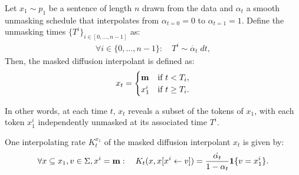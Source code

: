\begin{appdefinition}
Let $x_1 \sim p_1$ be a sentence of length $n$ drawn from the data and $\alpha_t$ a smooth unmasking schedule that interpolates from $\alpha_{t=0}=0$ to $\alpha_{t=1}=1$. Define the unmasking times $\{T^i\}_{i\in[0, \dots, n-1]}$ as:
\begin{align}
    \forall i \in \{0, \dots, n-1\}: \quad T^i \sim \dot{\alpha_t} \; dt,
\end{align}
Then, the masked diffusion interpolant is defined as:
\begin{align}
    x_t = \begin{cases}
        \mathbf{m} & \text{if } t < T_i, \\
        x_1^i & \text{if } t \geq T_i.
    \end{cases} 
\end{align}
\end{appdefinition}
In other words, at each time $t$, $x_t$ reveals a subset of the tokens of $x_1$, with each token $x_1^i$ independently unmasked at its associated time $T^i$. \begin{appprop} \label{prop:interpolating-rate}
One interpolating rate $K_t^{x_1}$ of the masked diffusion interpolant $x_t$ is given by:
\begin{align}
   \forall x \subseteq x_1, v \in \Sigma, x^i=\mathbf{m}: \quad  K_t(x, x[x^{i} \leftarrow v]) = \frac{\dot{\alpha_t}}{1-\alpha_t} \mathbf{1}\{v = x_1^i\}.
\end{align}
\end{appprop}
